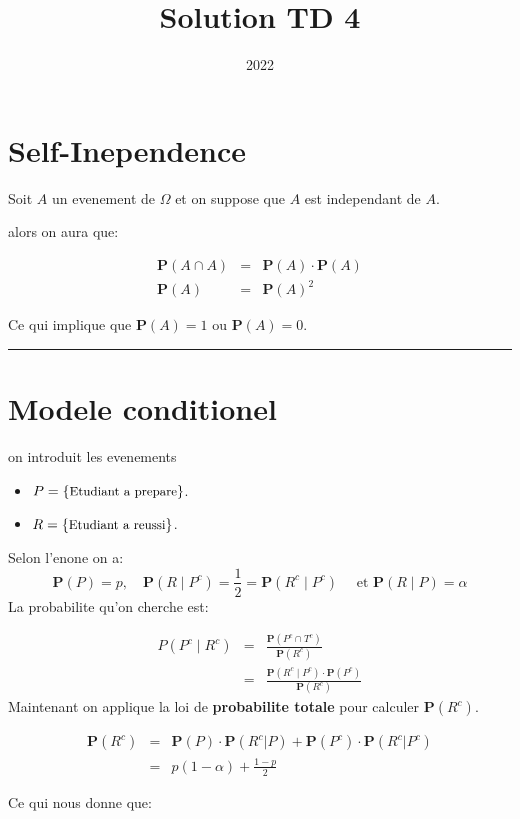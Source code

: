 \documentclass[a4paper]{tufte-handout}
\title{Solution TD 4}
\date{2022}
\begin{document}
\maketitle

\renewcommand{\P}{\mathbf{P}}

\section{Self-Inependence}

Soit $A$ un evenement de $\Omega$ et on suppose que $A$ est independant de $A$.

alors on aura que:

\begin{eqnarray*}
   \P(A \cap A) & = & \P(A)\cdot \P(A) \\
   \P(A)        & = & \P(A)^2
\end{eqnarray*}

Ce qui implique que $\P(A)= 1 $ ou $\P(A)=0$.

\hrule
\section{Modele conditionel}
on introduit les evenements 
\begin{itemize}
  \item $P = \{\text{\small Etudiant a prepare}\}$.
  \item $R = \{\text{\small Etudiant a reussi}\}$.
\end{itemize}
Selon l'enone on a:
\begin{equation*}
  \P(P) = p, \quad \P(R\;|\;P^c)= \frac{1}{2} = \P(R^c\;|\;P^c)\quad \text{ et }
  \P(R\;|\;P) = \alpha
\end{equation*}
La probabilite qu'on cherche est:

\begin{eqnarray*}
  P(P^c\;|\;R^c) &=& \frac{\P(P^c\cap T^c )}{\P(R^c)} \\[4pt]
                 &=& \frac{\P(R^c\;|\;P^c)\cdot \P(P^c)}{\P(R^c)}
\end{eqnarray*}
Maintenant on applique la loi de \textbf{probabilite totale} pour calculer
$\P(R^c)$.

\begin{eqnarray*}
  \P(R^c) &=& \P(P)\cdot\P(R^c|P) + \P(P^c)\cdot\P(R^c|P^c)\\
          &=& p(1-\alpha)  + \frac{1-p}{2}
\end{eqnarray*}

Ce qui nous donne que:
\end{document}
